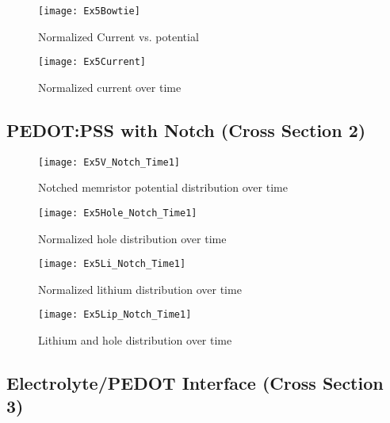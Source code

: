 \begin{figure}[!htp]
\centering
\texttt{[image: Ex5Bowtie]}
\caption{Normalized Current vs. potential} 
\label{}
\end{figure}

\begin{figure}[!htp]
\centering
\texttt{[image: Ex5Current]}
\caption{Normalized current over time} 
\label{}
\end{figure}



\clearpage
\subsection{PEDOT:PSS with Notch (Cross Section 2)}


\begin{landscape}
\begin{figure}[!htp]
\centering
\texttt{[image: Ex5V\_Notch\_Time1]}
\caption{Notched memristor potential distribution over time} 
\label{}
\end{figure}
\end{landscape}



\begin{landscape}
\begin{figure}[!htp]
\centering
\texttt{[image: Ex5Hole\_Notch\_Time1]}
\caption{Normalized hole distribution over time} 
\label{}
\end{figure}
\end{landscape}


\begin{landscape}
\begin{figure}[!htp]
\centering
\texttt{[image: Ex5Li\_Notch\_Time1]}
\caption{Normalized lithium distribution over time} 
\label{}
\end{figure}
\end{landscape}


\begin{landscape}
\begin{figure}[!htp]
\centering
\texttt{[image: Ex5Lip\_Notch\_Time1]}
\caption{Lithium and hole distribution over time} 
\label{}
\end{figure}
\end{landscape}


\clearpage
\subsection{Electrolyte/PEDOT Interface (Cross Section 3) }

